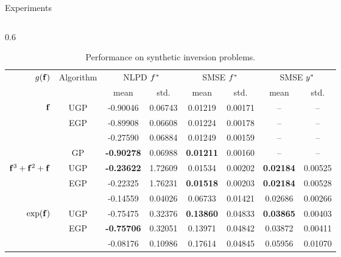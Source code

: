 \documentclass[final]{beamer}
\newlength{\twocolwid}
\begin{document}
\begin{frame}[t]
\begin{columns}[t]
\begin{column}{\twocolwid}
\begin{columns}[t,totalwidth=\twocolwid]
\begin{column}{\twocolwid}
\begin{block}{Experiments}
\begin{columns}
\begin{column}{0.6\twocolwid}


\begin{table}[tb]
    \centering

    \caption[]{
        Performance on synthetic inversion problems.
        }
    \vspace{5mm}
    \small
    \begin{tabular}{r|c| c c c c c c}
        \multirow{2}{*}{$g\!\left({{\mathbf{f}}}\right)$} & \multirow{2}{*}{Algorithm} & 
            \multicolumn{2}{c}{NLPD $f^{*}$} &
            \multicolumn{2}{c}{SMSE $f^{*}$} &
            \multicolumn{2}{c}{SMSE $y^{*}$} \\
        & & mean & std. & mean & std. & mean & std.\\
        \toprule
        $\mathbf{f}$ 
& UGP & -0.90046 & 0.06743 & 0.01219 & 0.00171 & -- & -- \\
& EGP & -0.89908 & 0.06608 & 0.01224 & 0.00178 & -- & -- \\
& \cite{Opper2009} & -0.27590 & 0.06884 & 0.01249 & 0.00159 & -- & -- \\
& GP & \textbf{-0.90278} & 0.06988 & \textbf{0.01211} & 0.00160 & -- & -- \\
        \midrule
        $\mathbf{f}^3 + \mathbf{f}^2 + \mathbf{f}$ 
& UGP & \textbf{-0.23622} & 1.72609 & 0.01534 & 0.00202 & \textbf{0.02184} & 0.00525 \\
& EGP & -0.22325 & 1.76231 & \textbf{0.01518} & 0.00203 & \textbf{0.02184} & 0.00528 \\
& \cite{Opper2009} & -0.14559 & 0.04026 & 0.06733 & 0.01421 & 0.02686 & 0.00266 \\
        \midrule
        $\exp\!\left({\mathbf{f}}\right)$ 
& UGP & -0.75475 & 0.32376 & \textbf{0.13860} & 0.04833 & \textbf{0.03865} & 0.00403 \\
& EGP & \textbf{-0.75706} & 0.32051 & 0.13971 & 0.04842 & 0.03872 & 0.00411 \\
& \cite{Opper2009} & -0.08176 & 0.10986 & 0.17614 & 0.04845 & 0.05956 & 0.01070 \\
        \midrule

\end{tabular}
\end{table}
\end{column}
\end{columns}
\end{block}
\end{column}
\end{columns}
\end{column}
\end{columns}
\end{frame}
\end{document}
